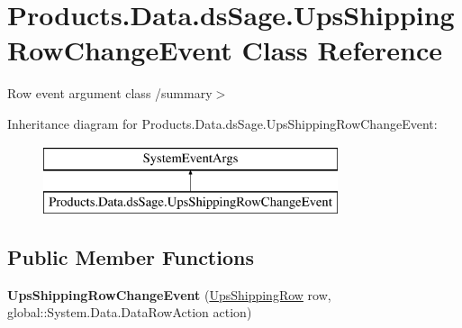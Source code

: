\hypertarget{class_products_1_1_data_1_1ds_sage_1_1_ups_shipping_row_change_event}{}\section{Products.\+Data.\+ds\+Sage.\+Ups\+Shipping\+Row\+Change\+Event Class Reference}
\label{class_products_1_1_data_1_1ds_sage_1_1_ups_shipping_row_change_event}


Row event argument class /summary$>$  


Inheritance diagram for Products.\+Data.\+ds\+Sage.\+Ups\+Shipping\+Row\+Change\+Event\+:\begin{figure}[H]
\begin{center}
\leavevmode
\includegraphics[height=2.000000cm]{class_products_1_1_data_1_1ds_sage_1_1_ups_shipping_row_change_event}
\end{center}
\end{figure}
\subsection*{Public Member Functions}
\begin{DoxyCompactItemize}
\item 
{\bfseries Ups\+Shipping\+Row\+Change\+Event} (\hyperlink{class_products_1_1_data_1_1ds_sage_1_1_ups_shipping_row}{Ups\+Shipping\+Row} row, global\+::\+System.\+Data.\+Data\+Row\+Action action)\hypertarget{class_products_1_1_data_1_1ds_sage_1_1_ups_shipping_row_change_event_afdaf6e52a88e3ca453feca28a67a43a6}{}\label{class_products_1_1_data_1_1ds_sage_1_1_ups_shipping_row_change_event_afdaf6e52a88e3ca453feca28a67a43a6}

\end{DoxyCompactItemize}

